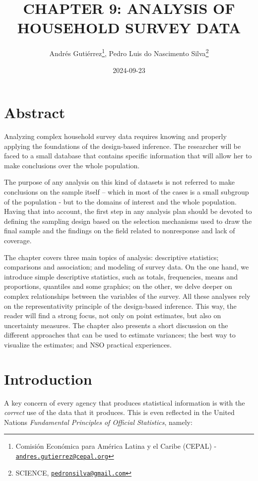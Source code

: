 \documentclass[
  12pt,
]{book}
\title{CHAPTER 9: ANALYSIS OF HOUSEHOLD SURVEY DATA}
\author{Andrés Gutiérrez\footnote{Comisión Económica para América Latina y el Caribe (CEPAL) - \href{mailto:andres.gutierrez@cepal.org}{\nolinkurl{andres.gutierrez@cepal.org}}}, Pedro Luis do Nascimento Silva\footnote{SCIENCE, \href{mailto:pedronsilva@gmail.com}{\nolinkurl{pedronsilva@gmail.com}}}}
\date{2024-09-23}
\begin{document}
\maketitle

{
\hypersetup{linkcolor=}
\setcounter{tocdepth}{0}
\tableofcontents
}
\listoffigures
\listoftables
\hypertarget{abstract}{%
\chapter*{Abstract}\label{abstract}}

Analyzing complex household survey data requires knowing and properly applying the foundations of the design-based inference. The researcher will be faced to a small database that contains specific information that will allow her to make conclusions over the whole population.

The purpose of any analysis on this kind of datasets is not referred to make conclusions on the sample itself -- which in most of the cases is a small subgroup of the population - but to the domains of interest and the whole population. Having that into account, the first step in any analysis plan should be devoted to defining the sampling design based on the selection mechanisms used to draw the final sample and the findings on the field related to nonresponse and lack of coverage.

The chapter covers three main topics of analysis: descriptive statistics; comparisons and association; and modeling of survey data. On the one hand, we introduce simple descriptive statistics, such as totals, frequencies, means and proportions, quantiles and some graphics; on the other, we delve deeper on complex relationships between the variables of the survey. All these analyses rely on the representativity principle of the design-based inference. This way, the reader will find a strong focus, not only on point estimates, but also on uncertainty measures. The chapter also presents a short discussion on the different approaches that can be used to estimate variances; the best way to visualize the estimates; and NSO practical experiences.

\hypertarget{introduction}{%
\chapter*{Introduction}\label{introduction}}

A key concern of every agency that produces statistical information is with the \emph{correct} use of the data that it produces. This is even reflected in the United Nations \emph{Fundamental Principles of Official Statistics}, namely:
\end{document}
